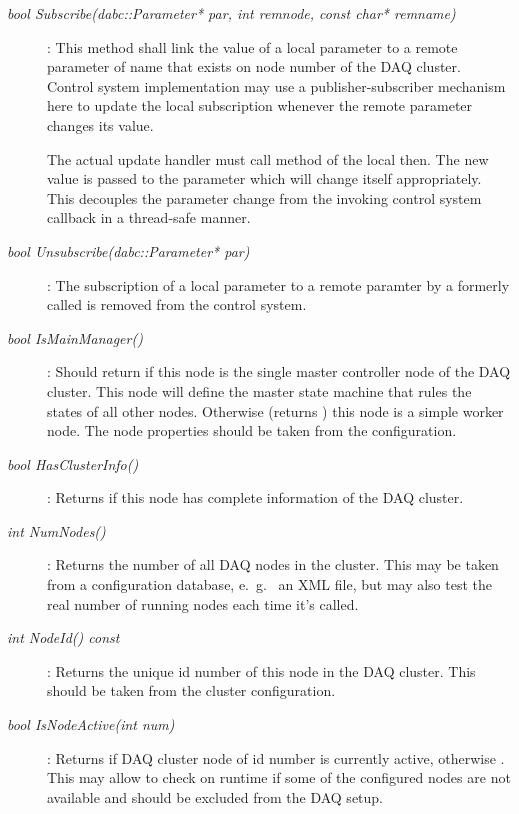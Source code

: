 \begin{description}
\item[\em bool Subscribe(dabc::Parameter* par, int remnode, 
const char* remname)] :
This method shall link the value of a local parameter  to a remote parameter
of name  that exists on node number  of the DAQ
cluster. Control system implementation may use a publisher-subscriber mechanism here
to update the local subscription whenever the remote parameter changes its value.

The actual update handler must call method 
of the local  then.
The new value  is passed to the parameter which 
will change itself appropriately. This decouples the parameter change
from the invoking control system callback in a thread-safe manner.

\item[\em bool Unsubscribe(dabc::Parameter* par)] :
The subscription of a local parameter  to a remote paramter by
a formerly called  is removed from the control system.


\item[\em bool IsMainManager()] :
Should return  if this node is the single 
master controller node of the DAQ cluster. This node will define
the master state machine that rules the states 
of all other nodes.
Otherwise (returns ) this node is a simple worker node.
The node properties should be taken from the configuration.

\item[\em bool HasClusterInfo()]:
Returns  if this node has complete information of the DAQ cluster.


\item[\em int NumNodes()] :
Returns the number of all DAQ nodes in the cluster. This may be taken
from a configuration database, e.~g.~ an XML file, but may also test the
real number of running nodes each time it's called.

\item[\em int NodeId() const] : 
Returns the unique id number of this node in the DAQ cluster.
This should be taken from the cluster configuration.

\item[\em bool IsNodeActive(int num)] : 
Returns  if DAQ cluster node of id number 
is currently active, otherwise . 
This may allow to check on runtime if some of the
configured nodes are not available and should be excluded from the
DAQ setup.


\end{description}
